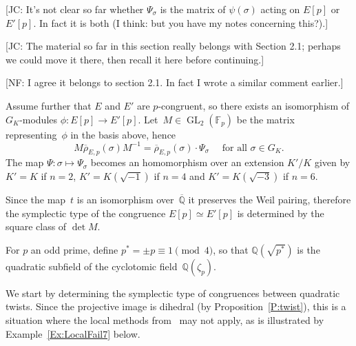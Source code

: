 \documentclass[12pt, reqno]{amsart}
\newcommand{\F}{\mathbb{F}}
\newcommand{\Q}{\mathbb{Q}}
\newcommand{\Qbar}{{\overline{\Q}}}
\newcommand{\rhobar}{{\overline{\rho}}}
\newcommand{\GL}{\operatorname{GL}}
\numberwithin{equation}{section}
\theoremstyle{definition}
\theoremstyle{remark}
\newcommand{\nf}[1]{{\color{blue} \textsf{[NF: #1]}}}
\newcommand{\jc}[1]{{\color{darkgreen} \textsf{[JC: #1]}}}
\begin{document}
\jc{It's not clear so far whether $\Psi_\sigma$ is the matrix of
  $\psi(\sigma)$ acting on $E[p]$ or $E'[p]$.  In fact it is both (I
  think: but you have my notes concerning this?).}

\jc{The material so far in this section really belongs with Section
  2.1; perhaps we could move it there, then recall it here before
  continuing.}
 
\nf{I agree it belongs to section 2.1. In fact I wrote a similar comment earlier.} 

Assume further that $E$ and $E'$ are $p$-congruent, so there exists an 
isomorphism of $G_K$-modules $\phi : E[p] \to E'[p]$. Let~$M \in \GL_2(\F_p)$ be the matrix representing~$\phi$ in the basis above, hence
\begin{equation}\label{E:PsiM}
M \rhobar_{E,p}(\sigma) M^{-1} = \rhobar_{E,p}(\sigma) \cdot \Psi_\sigma 
 \quad \text{ for all } \sigma \in G_K.
\end{equation}
The map $\Psi : \sigma \mapsto \Psi_\sigma$ becomes an homomorphism over an extension $K'/K$ given by $K'=K$ if $n=2$, $K'=K(\sqrt{-1})$ if $n=4$ and $K'=K(\sqrt{-3})$ if $n=6$.


Since the map~$t$ is an isomorphism over~$\Qbar$ it preserves the Weil pairing, therefore the symplectic type of the congruence $E[p] \simeq E'[p]$ is determined by the square class of $\det M$.

For $p$ an odd prime, define $p^*=\pm p\equiv1\pmod4$, so that
$\Q(\sqrt{p^*})$ is the quadratic subfield of the cyclotomic
field~$\Q(\zeta_p)$. 

We start by determining the symplectic type of congruences between quadratic twists.
Since the projective
image is dihedral (by Proposition~\ref{P:twist}), this
is a situation where the local methods from~\cite{FKSym} may not
apply, as is illustrated by Example~\ref{Ex:LocalFail7} below.
\end{document}
